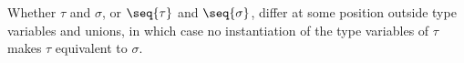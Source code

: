 Whether $\tau$ and $\sigma$, or $\seq{\tau}$ and $\seq{\sigma}$, differ at some position outside type variables and
unions, in which case no instantiation of the type variables of $\tau$ makes $\tau$ equivalent to $\sigma$.
